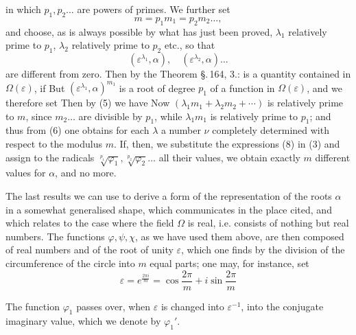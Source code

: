 in which $p_1, p_2 \ldots$ are powers of  primes.
We further set
\[
m = p_1 m_1 = p_2 m_2 \ldots,
\]
and choose, as is always possible by what has just been proved,
$\lambda_1$ relatively prime to $p_1$, $\lambda_2$ relatively prime to $p_2$ etc., so that
\[
(\varepsilon^{\lambda_1}, \alpha), \quad (\varepsilon^{\lambda_2}, \alpha) \ldots
\]
are different from zero. Then by the Theorem \S.\,164, 3.:
is a quantity contained in $\Omega(\varepsilon)$, if
But $(\varepsilon^{\lambda_1}, \alpha)^{m_1}$ is a root of degree $p_1$ of a function
in $\Omega(\varepsilon)$, and we therefore set
Then by (5) we have
Now $(\lambda_1 m_1 + \lambda_2 m_2 + \cdots)$ is relatively prime to $m$, since $m_2 \ldots$
are divisible by $p_1$, while $\lambda_1 m_1$ is relatively prime to $p_1$; and thus from (6)
one obtains for each $\lambda$ a number $\nu$ completely determined
with respect to the modulus $m$.
If, then, we substitute the expressions (8) in (3) and assign to the
radicals $\sqrt[p_1]{\varphi_1}, \sqrt[p_2]{\varphi_2} \ldots$ all their values, we obtain
exactly $m$ different values for $\alpha$, and no more.

The last results we can use to derive a form of the
representation of the roots $\alpha$ in a somewhat generalised shape,
which  communicates in the place cited, and which
relates to the case where the field $\Omega$ is real, i.e. consists of
nothing but real numbers. The functions $\varphi, \psi, \chi$, as we
have used them above, are then composed of real
numbers and of the root of unity $\varepsilon$, which one finds by the division
of the circumference of the circle into $m$ equal parts; one may, for instance, set
\[
\varepsilon = e^{\frac{2\pi i}{m}} = \cos\frac{2\pi}{m} + i \sin\frac{2\pi}{m}
\]

The function $\varphi_1$ passes over, when $\varepsilon$ is changed into $\varepsilon^{-1}$, into
the conjugate imaginary value, which we denote by $\varphi_1'$.

